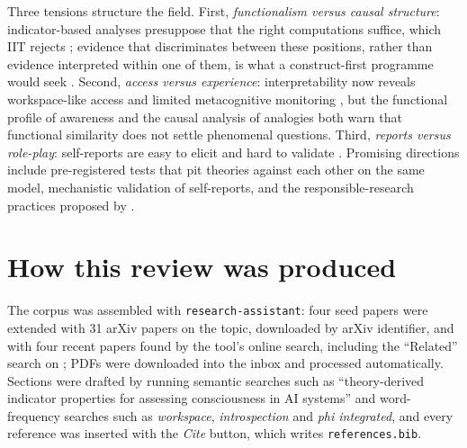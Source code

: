 \documentclass[11pt,a4paper]{article}
\begin{document}
Three tensions structure the field. First, \emph{functionalism versus causal
structure}: indicator-based analyses \citep{butlin2023consciousness,goldstein2024case}
presuppose that the right computations suffice, which IIT rejects
\citep{findlay2024dissociating}; evidence that discriminates between these
positions, rather than evidence interpreted within one of them, is what a
construct-first programme would seek \citep{fazekas2024construct}. Second,
\emph{access versus experience}: interpretability now reveals workspace-like
access \citep{gurnee2026verbalizable} and limited metacognitive monitoring
\citep{jian2025language}, but the functional profile of awareness
\citep{thorat2026full} and the causal analysis of analogies
\citep{holyoak2026analogy} both warn that functional similarity does not settle
phenomenal questions. Third, \emph{reports versus role-play}: self-reports are
easy to elicit \citep{berg2025large} and hard to validate
\citep{perez2023evaluating,comsa2025make}. Promising directions include
pre-registered tests that pit theories against each other on the same model,
mechanistic validation of self-reports, and the responsible-research practices
proposed by \citet{butlin2025principles}.

\section*{How this review was produced}
The corpus was assembled with \texttt{research-assistant}: four seed papers
were extended with 31 arXiv papers on the topic, downloaded by arXiv
identifier, and with four recent papers found
by the tool's online search, including the ``Related'' search on
\citet{butlin2023consciousness}; PDFs were downloaded into the inbox and
processed automatically. Sections were drafted by
running semantic searches such as ``theory-derived indicator properties for
assessing consciousness in AI systems'' and word-frequency searches such as
\emph{workspace}, \emph{introspection} and \emph{phi integrated}, and every
reference was inserted with the \emph{Cite} button, which writes
\texttt{references.bib}.



\end{document}
